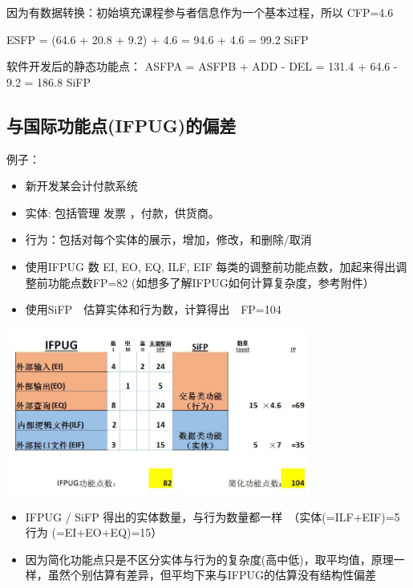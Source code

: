 \begin{description}
\item[]
\end{description}

因为有数据转换：初始填充课程参与者信息作为一个基本过程，所以 CFP=4.6

\begin{description}
\tightlist
\item[]
ESFP = (64.6 + 20.8 + 9.2) + 4.6 = 94.6 + 4.6 = 99.2 SiFP
\end{description}

软件开发后的静态功能点： ASFPA = ASFPB + ADD - DEL = 131.4 + 64.6 - 9.2
= 186.8 SiFP


\hypertarget{ux4e0eux56fdux9645ux529fux80fdux70b9ifpugux7684ux504fux5dee}{%
\subsection{与国际功能点(IFPUG)的偏差}\label{ux4e0eux56fdux9645ux529fux80fdux70b9ifpugux7684ux504fux5dee}}

例子：

\begin{itemize}
\tightlist
\item
  新开发某会计付款系统
\item
  实体: 包括管理 发票 ，付款，供货商。
\item
  行为：包括对每个实体的展示，增加，修改，和删除/取消
\item
  使用IFPUG 数 EI, EO, EQ, ILF, EIF
  每类的调整前功能点数，加起来得出调整前功能点数FP=82
  (如想多了解IFPUG如何计算复杂度，参考附件）
\item
  使用SiFP　估算实体和行为数，计算得出　FP=104
\end{itemize}


\includegraphics[width=10cm]{FPAS11.jpg}

\begin{itemize}
\tightlist
\item
  IFPUG / SiFP
  得出的实体数量，与行为数量都一样　（实体(=ILF+EIF)=5　　行为
  (=EI+EO+EQ)=15）
\item
  因为简化功能点只是不区分实体与行为的复杂度(高中低)，取平均值，原理一样，虽然个别估算有差异，但平均下来与IFPUG的估算没有结构性偏差
\end{itemize}

